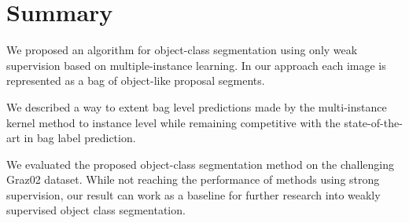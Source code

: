 \section{Summary}

We proposed an algorithm for object-class segmentation using only weak
supervision based on multiple-instance learning. In our approach each image is
represented as a bag of object-like proposal segments.

We described a way to extent bag level predictions made by the multi-instance
kernel method to instance level while remaining competitive with the
state-of-the-art in bag label prediction.

We evaluated the proposed object-class segmentation method on the challenging
Graz02 dataset. While not reaching the performance of methods using strong
supervision, our result can work as a baseline for further research into weakly
supervised object class segmentation.

